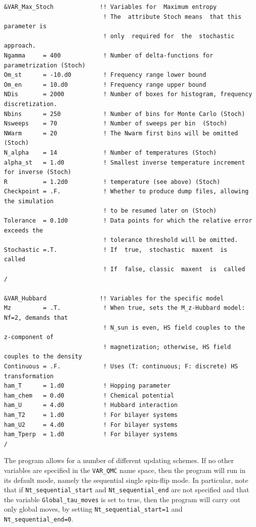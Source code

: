 \begin{lstlisting}[style=fortran,escapechar=\#,breaklines=true]
&VAR_Max_Stoch             !! Variables for  Maximum entropy
                            ! The  attribute Stoch means  that this  parameter is 
                            ! only  required for  the  stochastic  approach. 
Ngamma     = 400            ! Number of delta-functions for parametrization (Stoch)
Om_st      = -10.d0         ! Frequency range lower bound
Om_en      = 10.d0          ! Frequency range upper bound
NDis       = 2000           ! Number of boxes for histogram, frequency  discretization.  
Nbins      = 250            ! Number of bins for Monte Carlo (Stoch)
Nsweeps    = 70             ! Number of sweeps per bin  (Stoch)
NWarm      = 20             ! The Nwarm first bins will be omitted (Stoch)
N_alpha    = 14             ! Number of temperatures (Stoch)
alpha_st   = 1.d0           ! Smallest inverse temperature increment for inverse (Stoch)
R          = 1.2d0          ! temperature (see above) (Stoch) 
Checkpoint = .F.            ! Whether to produce dump files, allowing the simulation
                            ! to be resumed later on (Stoch)
Tolerance  = 0.1d0          ! Data points for which the relative error exceeds the
                            ! tolerance threshold will be omitted.
Stochastic =.T.             ! If  true,  stochastic  maxent  is  called
                            ! If  false, classic  maxent  is  called
/

&VAR_Hubbard               !! Variables for the specific model
Mz         = .T.            ! When true, sets the M_z-Hubbard model: Nf=2, demands that
                            ! N_sun is even, HS field couples to the z-component of
                            ! magnetization; otherwise, HS field couples to the density
Continuous = .F.            ! Uses (T: continuous; F: discrete) HS transformation
ham_T      = 1.d0           ! Hopping parameter
ham_chem   = 0.d0           ! Chemical potential
ham_U      = 4.d0           ! Hubbard interaction
ham_T2     = 1.d0           ! For bilayer systems
ham_U2     = 4.d0           ! For bilayer systems
ham_Tperp  = 1.d0           ! For bilayer systems
/
\end{lstlisting}
%
\FloatBarrier

The program allows for a number of different  updating schemes.  If no other variables are specified in the \texttt{VAR\_QMC} name space, then the program will run in its default mode, namely the sequential single spin-flip mode.
In particular, note that if \texttt{Nt\_sequential\_start}  and \texttt{Nt\_sequential\_end}  are not specified and that the variable \texttt{Global\_tau\_moves}  is set to true, then  the program will  carry out only global moves, by setting \texttt{Nt\_sequential\_start=1}  and \texttt{Nt\_sequential\_end=0}. 

